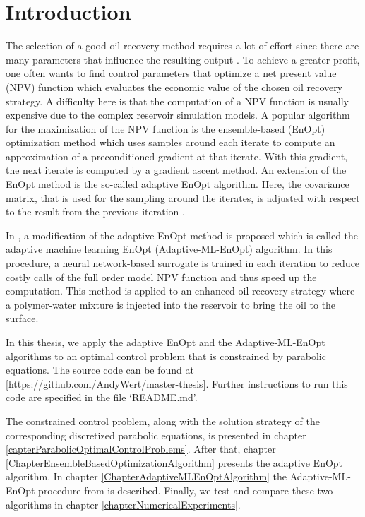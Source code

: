 \chapter{Introduction}

The selection of a good oil recovery method requires a lot of effort since there are many parameters that influence the resulting output \cite{doi:10.1137/1.9780898717075}. To achieve a greater profit, one often wants to find control parameters that optimize a net present value (NPV) function which evaluates the economic value of the chosen oil recovery strategy. A difficulty here is that the computation of a NPV function is usually expensive due to the complex reservoir simulation models. A popular algorithm for the maximization of the NPV function is the ensemble-based (EnOpt) optimization method \cite{articleChen} which uses samples around each iterate to compute an approximation of a preconditioned gradient at that iterate. With this gradient, the next iterate is computed by a gradient ascent method. An extension of the EnOpt method is the so-called adaptive EnOpt algorithm. Here, the covariance matrix, that is used for the sampling around the iterates, is adjusted with respect to the result from the previous iteration \cite{Stordal2016-cj}.

In \cite{Keil2022-dj}, a modification of the adaptive EnOpt method is proposed which is called the adaptive machine learning EnOpt (Adaptive-ML-EnOpt) algorithm. In this procedure, a neural network-based surrogate is trained in each iteration to reduce costly calls of the full order model NPV function and thus speed up the computation. This method is applied to an enhanced oil recovery strategy \cite{ABIDIN201211} where a polymer-water mixture is injected into the reservoir to bring the oil to the surface.

In this thesis, we apply the adaptive EnOpt and the Adaptive-ML-EnOpt algorithms to an optimal control problem that is constrained by parabolic equations. The source code can be found at [https://github.com/AndyWert/master-thesis]. Further instructions to run this code are specified in the file `README.md'.

The constrained control problem, along with the solution strategy of the corresponding discretized parabolic equations, is presented in chapter \ref{capterParabolicOptimalControlProblems}. After that, chapter \ref{ChapterEnsembleBasedOptimizationAlgorithm} presents the adaptive EnOpt algorithm. In chapter \ref{ChapterAdaptiveMLEnOptAlgorithm} the Adaptive-ML-EnOpt procedure from \cite{Keil2022-dj} is described. Finally, we test and compare these two algorithms in chapter \ref{chapterNumericalExperiments}.